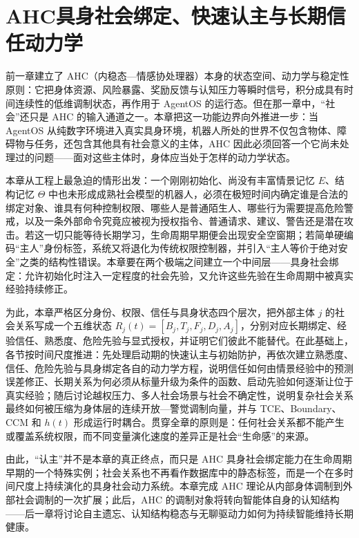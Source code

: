 \chapter{AHC具身社会绑定、快速认主与长期信任动力学}
\label{chap:ahc_social_binding}

\begin{chapterlead}
前一章建立了 AHC（内稳态—情感协处理器）本身的状态空间、动力学与稳定性原则：它把身体资源、风险暴露、奖励反馈与认知压力等瞬时信号，积分成具有时间连续性的低维调制状态，再作用于 AgentOS 的运行态。但在那一章中，“社会”还只是 AHC 的输入通道之一。本章把这一功能边界向外推进一步：当 AgentOS 从纯数字环境进入真实具身环境，机器人所处的世界不仅包含物体、障碍物与任务，还包含其他具有社会意义的主体，AHC 因此必须回答一个它尚未处理过的问题——面对这些主体时，身体应当处于怎样的动力学状态。

本章从工程上最急迫的情形出发：一个刚刚初始化、尚没有丰富情景记忆 $E$、结构记忆 $\Theta$ 中也未形成成熟社会模型的机器人，必须在极短时间内确定谁是合法的绑定对象、谁具有何种控制权限、哪些人是普通陌生人、哪些行为需要提高危险警戒，以及一条外部命令究竟应被视为授权指令、普通请求、建议、警告还是潜在攻击。若这一切只能等待长期学习，生命周期早期便会出现安全空窗期；若简单硬编码“主人”身份标签，系统又将退化为传统权限控制器，并引入“主人等价于绝对安全”之类的结构性错误。本章要在两个极端之间建立一个中间层——具身社会绑定：允许初始化时注入一定程度的社会先验，又允许这些先验在生命周期中被真实经验持续修正。

为此，本章严格区分身份、权限、信任与具身状态四个层次，把外部主体 $j$ 的社会关系写成一个五维状态 $R_j(t)=[B_j,T_j,F_j,D_j,A_j]$，分别对应长期绑定、经验信任、熟悉度、危险先验与显式授权，并证明它们彼此不能替代。在此基础上，各节按时间尺度推进：先处理启动期的快速认主与初始防护，再依次建立熟悉度、信任、危险先验与具身绑定各自的动力学方程，说明信任如何由情景经验中的预测误差修正、长期关系为何必须从标量升级为条件的函数、启动先验如何逐渐让位于真实经验；随后讨论越权压力、多人社会场景与社会不确定性，说明复杂社会关系最终如何被压缩为身体层的连续开放—警觉调制向量，并与 TCE、Boundary、CCM 和 $h(t)$ 形成运行时耦合。贯穿全章的原则是：任何社会关系都不能产生或覆盖系统权限，而不同变量演化速度的差异正是社会“生命感”的来源。

由此，“认主”并不是本章的真正终点，而只是 AHC 具身社会绑定能力在生命周期早期的一个特殊实例；社会关系也不再看作数据库中的静态标签，而是一个在多时间尺度上持续演化的具身社会动力系统。本章完成 AHC 理论从内部身体调制到外部社会调制的一次扩展；此后，AHC 的调制对象将转向智能体自身的认知结构——后一章将讨论自主遗忘、认知结构稳态与无聊驱动力如何为持续智能维持长期健康。
\end{chapterlead}

